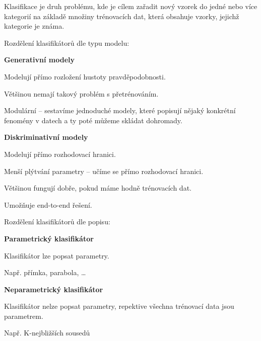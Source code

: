\begin{compactitem}
    \item Klasifikace je druh problému, kde je cílem zařadit nový vzorek do jedné nebo více kategorií na základě množiny trénovacích dat, která obsahuje vzorky, jejichž kategorie je známa.

    \item Rozdělení klasifikátorů dle typu modelu: \begin{compactitem}
        \item \textbf{Generativní modely} \begin{compactitem}
            \item Modelují přímo rozložení hustoty pravděpodobnosti.
            \item Většinou nemají takový problém s přetrénováním.
            \item Modulární -- sestavíme jednoduché modely, které popisují nějaký konkrétní fenomény v datech a ty poté můžeme skládat dohromady.
        \end{compactitem}

        \item \textbf{Diskriminativní modely} \begin{compactitem}
            \item Modelují přímo rozhodovací hranici.
            \item Menší plýtvání parametry -- učíme se přímo rozhodovací hranici.
            \item Většinou fungují dobře, pokud máme hodně trénovacích dat.
            \item Umožňuje end-to-end řešení.
        \end{compactitem}
    \end{compactitem}

    \item Rozdělení klasifikátorů dle popisu: \begin{compactitem}
        \item \textbf{Parametrický klasifikátor} \begin{compactitem}
            \item Klasifikátor lze popsat parametry.
            \item Např. přímka, parabola, \dots
        \end{compactitem}

        \item \textbf{Neparametrický klasifikátor} \begin{compactitem}
            \item Klasifikátor nelze popsat parametry, repektive všechna trénovací data jsou parametrem.
            \item Např. K-nejbližších sousedů
        \end{compactitem}
    \end{compactitem}

\end{compactitem}

